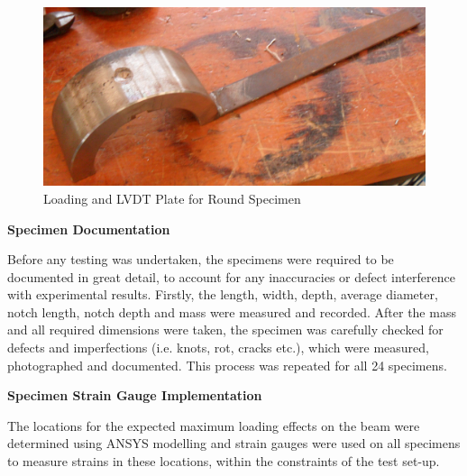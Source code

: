 \documentclass[11pt,a4paper]{article}
\numberwithin{equation}{subsection}
\begin{document}
\begin{figure}[h]
	\begin{center}
		\includegraphics[scale=0.1]{Round_Plate}
	\end{center}
	\caption{Loading and LVDT Plate for Round Specimen}
	\label{fig:RoundPlate}
\end{figure}

\vspace*{\baselineskip}

\noindent
\textbf{Specimen Documentation}\par
\noindent
Before any testing was undertaken, the specimens were required to be documented in great detail, to account for any inaccuracies or defect interference with experimental results. Firstly, the length, width, depth, average diameter, notch length, notch depth and mass were measured and recorded. After the mass and all required dimensions were taken, the specimen was carefully checked for defects and imperfections (i.e. knots, rot, cracks etc.), which were measured, photographed and documented. This process was repeated for all 24 specimens. 

\vspace*{\baselineskip}

\noindent
\textbf{Specimen Strain Gauge Implementation}\par
\noindent
The locations for the expected maximum loading effects on the beam were determined using ANSYS modelling and strain gauges were used on all specimens to measure strains in these locations, within the constraints of the test set-up.
\end{document}
